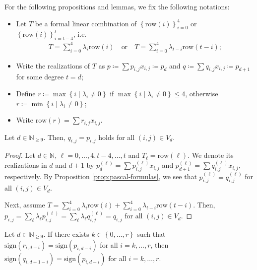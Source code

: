 For the following propositions and lemmas, we fix the following notations:
\begin{itemize}
    \item Let \( T \) be a formal linear combination of \( \left\{ \mathrm{row}(i) \right\}_{i=0}^4 \) or \( \left\{ \mathrm{row}(i) \right\}_{i=t-4}^t \), i.e. 
    \begin{align*}
        T = \sum_{i=0}^{4}  \lambda_{i} \mathrm{row}(i) \quad \text{or} \quad T = \sum_{i=0}^{4}  \lambda_{t-i} \mathrm{row}(t-i);
    \end{align*}
    \item Write the realizations of \( T \) as \( p \coloneqq \sum p_{i,j}x_{i,j}  \coloneqq p_d  \) and \( q \coloneqq \sum q_{i,j}x_{i,j} \coloneqq p_{d+1} \) for some degree \( t = d \);
    \item Define \( r \coloneqq \max\left\{ i \mid \lambda_i \neq 0 \right\} \) if \(  \max\left\{ i \mid \lambda_i \neq 0 \right\} \leq 4 \), otherwise \( r \coloneqq \min\left\{ i \mid \lambda_i \neq 0 \right\} \); 
    \item Write \( \mathrm{row}(r) = \sum r_{i,j}x_{i,j} \).
\end{itemize}  

\begin{lemma}\label{prop:row_extend_d}
    Let \( d \in \mathbb{N}_{\geq 9} \). Then, \( q_{i,j} = p_{i,j} \) holds for all \( (i,j) \in V_d \).
\end{lemma}
  
\begin{proof}
    Let \( d \in \mathbb{N} \), \( \ell = 0, \dots, 4,t-4,\dots,t \) and \(T_{\ell} =  \mathrm{row}(\ell) \). We denote its realizations in \( d \) and \( d + 1 \) by \( p_d^{(\ell)} = \sum p_{i,j}^{(\ell)}x_{i,j} \) and \( p_{d+1}^{(\ell)} = \sum q_{i,j}^{(\ell)}x_{i,j} \), respectively. By Proposition \ref{prop:pascal-formulas}, we see that \( p_{i,j}^{(\ell)} = q_{i,j}^{(\ell)} \) for all \( (i,j) \in V_d \).
    
    Next, assume \( T =  \sum_{i=0}^{4}  \lambda_{i} \mathrm{row}(i) + \sum_{i=0}^{4}  \lambda_{t-i} \mathrm{row}(t-i)  \). Then, \( p_{i,j} = \sum_{\ell} \lambda_\ell p_{i,j}^{(\ell)} = \sum_{\ell} \lambda_\ell q_{i,j}^{(\ell)} = q_{i,j} \) for all \( (i,j) \in V_d \).
\end{proof}
  
  
\begin{lemma}\label{lemma:sign_row_propagation}
    Let \( d \in \mathbb{N}_{\geq 9} \). If there exists \( k \in \left\{ 0, \dots, r \right\} \) such that $\mathrm{sign}(r_{i,d-i}) = \mathrm{sign}(p_{i,d-i})$ for all \( i = k, \dots, r \), then \( \mathrm{sign}(q_{i,d+1-i}) = \mathrm{sign}(p_{i,d-i}) \) for all \( i = k, \dots, r\).
\end{lemma}

